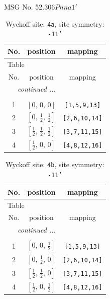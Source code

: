 \documentclass[fleqn,8pt]{jsarticle}
\begin{document}
\setcounter{MaxMatrixCols}{32}

\renewcommand{\tablename}{Table~}
\renewcommand{\figurename}{Figure~}
\begin{center}
\LARGE
MSG No. 52.306\quad$Pnna1'$
\end{center}
\renewcommand{\arraystretch}{1.2}
\begin{longtable}{ccc}
\caption{Wyckoff site: {\tt 4a}, site symmetry: {\tt -11'}}
 \\
 \hline \hline
No. & position & mapping \\ \hline \endfirsthead

\multicolumn{2}{l}{\tablename\ \thetable{}} \\
 \hline \hline
No. & position & mapping \\ \hline \endhead

 \hline \hline
\multicolumn{2}{r}{\footnotesize\it continued ...} \\ \endfoot

 \hline \hline
\multicolumn{2}{r}{} \\ \endlastfoot

1 & $\left[ 0,\, 0,\, 0 \right]$ & {\tt [1,5,9,13]} \\ \hline
2 & $\left[ 0,\, \frac{1}{2},\, \frac{1}{2} \right]$ & {\tt [2,6,10,14]} \\ \hline
3 & $\left[ \frac{1}{2},\, \frac{1}{2},\, \frac{1}{2} \right]$ & {\tt [3,7,11,15]} \\ \hline
4 & $\left[ \frac{1}{2},\, 0,\, 0 \right]$ & {\tt [4,8,12,16]} \\
\end{longtable}
\renewcommand{\arraystretch}{1.2}
\begin{longtable}{ccc}
\caption{Wyckoff site: {\tt 4b}, site symmetry: {\tt -11'}}
 \\
 \hline \hline
No. & position & mapping \\ \hline \endfirsthead

\multicolumn{2}{l}{\tablename\ \thetable{}} \\
 \hline \hline
No. & position & mapping \\ \hline \endhead

 \hline \hline
\multicolumn{2}{r}{\footnotesize\it continued ...} \\ \endfoot

 \hline \hline
\multicolumn{2}{r}{} \\ \endlastfoot

1 & $\left[ 0,\, 0,\, \frac{1}{2} \right]$ & {\tt [1,5,9,13]} \\ \hline
2 & $\left[ 0,\, \frac{1}{2},\, 0 \right]$ & {\tt [2,6,10,14]} \\ \hline
3 & $\left[ \frac{1}{2},\, \frac{1}{2},\, 0 \right]$ & {\tt [3,7,11,15]} \\ \hline
4 & $\left[ \frac{1}{2},\, 0,\, \frac{1}{2} \right]$ & {\tt [4,8,12,16]} \\
\end{longtable}
\end{document}
